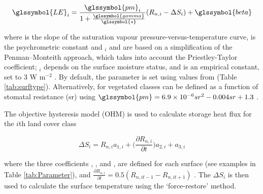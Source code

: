\documentclass[final,3p,times,authoryear]{elsarticle}
\begin{document}
\begin{equation} 
\glssymbol{LE}_{i} = 
\frac{\glssymbol{pm}_{i}}{1+\frac{\glssymbol{gamma}}{\glssymbol{s}}}
(R_{n,i}-\Delta S_{i})+ \glssymbol{beta}
\label{eq:LE} \end{equation} 

where  is the slope of the saturation vapour pressure-versus-temperature curve,  is the psychrometric constant and $_{i}$ and  are based on a simplification of the Penman–Monteith approach, which takes into account the Priestley-Taylor coefficient; $_{i}$ depends on the surface moisture status, and  is an empirical constant, set to 3 W m$^{-2}$ \citep{Grimmond2002a}. By default, the  parameter is set using values from \cite{Hanna1992} (Table \ref{tab:surftype}). Alternatively,  for vegetated classes can be defined as a function of stomatal resistance (sr) using $\glssymbol{pm} = 6.9\times10^{-6} sr^{2} - 0.004 sr + 1.3$ \citep{DeBruin1983}.  

The objective hysteresis model (OHM) is used to calculate storage heat flux for the $i$th land cover class  \citep{Grimmond2002a} 

\begin{equation} 
\Delta S_{i} = R_{n,i} a_{1,i} + \Big( \frac{\partial R_{n,i}}{\partial t}   \Big)a_{2,i} + a_{3,i}
\label{eq:ohm} \end{equation} 




where the three coefficients , , and , are defined for each surface (see examples in Table \ref{tab:Parameter}), and $\frac{\partial R_{n,i}}{\partial t} =0.5(R_{n,it-1} - R_{n,it+1})$  .  The $\Delta S_{i}$ is then used to calculate the surface temperature using the `force-restore' method.
\end{document}
